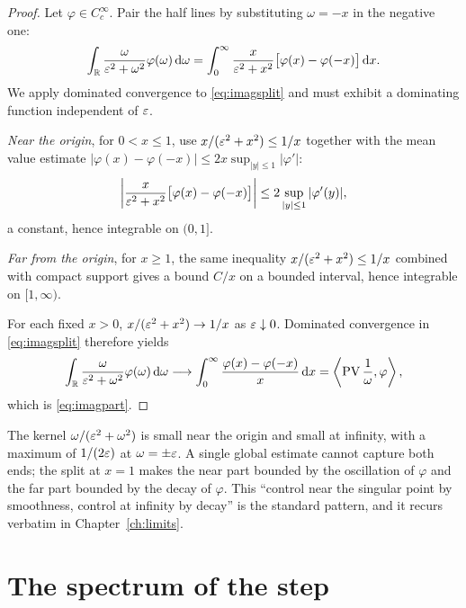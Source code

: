 \begin{proof}
Let $\varphi\in C_{c}^{\infty}$. Pair the half lines by substituting $\omega=-x$ in the negative
one:
\begin{equation}
\int_{\mathbb{R}}\frac{\omega}{\varepsilon^{2}+\omega^{2}}\varphi(\omega)\,\mathrm{d}\omega
=\int_{0}^{\infty}\frac{x}{\varepsilon^{2}+x^{2}}\big[\varphi(x)-\varphi(-x)\big]\,\mathrm{d} x .
\label{eq:imagsplit}
\end{equation}
We apply dominated convergence to \eqref{eq:imagsplit} and must exhibit a dominating function
independent of $\varepsilon$.

\emph{Near the origin}, for $0<x\le1$, use $x/(\varepsilon^{2}+x^{2})\le1/x$ together with the mean value
estimate $|\varphi(x)-\varphi(-x)|\le2x\sup_{|y|\le1}|\varphi'|$:
\begin{equation}
\left|\frac{x}{\varepsilon^{2}+x^{2}}\big[\varphi(x)-\varphi(-x)\big]\right|
\le 2\sup_{|y|\le1}|\varphi'(y)| ,
\end{equation}
a constant, hence integrable on $(0,1]$.

\emph{Far from the origin}, for $x\ge1$, the same inequality $x/(\varepsilon^{2}+x^{2})\le1/x$ combined
with compact support gives a bound $C/x$ on a bounded interval, hence integrable on $[1,\infty)$.

For each fixed $x>0$, $x/(\varepsilon^{2}+x^{2})\to1/x$ as $\varepsilon\downarrow0$. Dominated convergence in
\eqref{eq:imagsplit} therefore yields
\begin{equation}
\int_{\mathbb{R}}\frac{\omega}{\varepsilon^{2}+\omega^{2}}\varphi(\omega)\,\mathrm{d}\omega
\longrightarrow\int_{0}^{\infty}\frac{\varphi(x)-\varphi(-x)}{x}\,\mathrm{d} x
=\left\langle\operatorname{PV}\frac{1}{\omega},\varphi\right\rangle ,
\end{equation}
which is \eqref{eq:imagpart}.
\end{proof}

\begin{remark}
The kernel $\omega/(\varepsilon^{2}+\omega^{2})$ is small near the origin and small at infinity, with a
maximum of $1/(2\varepsilon)$ at $\omega=\pm\varepsilon$. A single global estimate cannot capture both ends; the
split at $x=1$ makes the near part bounded by the oscillation of $\varphi$ and the far part bounded
by the decay of $\varphi$. This ``control near the singular point by smoothness, control at
infinity by decay'' is the standard pattern, and it recurs verbatim in
Chapter~\ref{ch:limits}.
\end{remark}

\section{The spectrum of the step}

